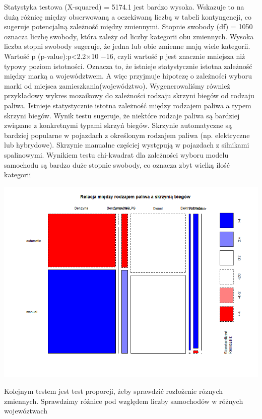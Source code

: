 \documentclass[
]{article}
\begin{document}
Statystyka testowa (X-squared) = 5174.1 jest bardzo wysoka. Wskazuje to
na dużą różnicę między obserwowaną a oczekiwaną liczbą w tabeli
kontyngencji, co sugeruje potencjalną zależność między zmiennymi.
Stopnie swobody (df) = 1050 oznacza liczbę swobody, która zależy od
liczby kategorii obu zmiennych. Wysoka liczba stopni swobody sugeruje,
że jedna lub obie zmienne mają wiele kategorii. Wartość p
(p-value):p\textless2.2×10 −16, czyli wartość p jest znacznie mniejsza
niż typowy poziom istotności. Oznacza to, że istnieje statystycznie
istotna zależność między marką a województwem. A więc przyjmuje hipotezę
o zależności wyboru marki od miejsca zamieszkania(województwo).
Wygenerowaliśmy również przykładowy wykres mozaikowy do zależności
rodzaju skrzyni biegów od rodzaju paliwa. Istnieje statystycznie istotna
zależność między rodzajem paliwa a typem skrzyni biegów. Wynik testu
sugeruje, że niektóre rodzaje paliwa są bardziej związane z konkretnymi
typami skrzyń biegów. Skrzynie automatyczne są bardziej popularne w
pojazdach z określonym rodzajem paliwa (np. elektryczne lub hybrydowe).
Skrzynie manualne częściej występują w pojazdach z silnikami
spalinowymi. Wynikiem testu chi-kwadrat dla zależności wyboru modelu
samochodu są bardzo duże stopnie swobody, co oznacza zbyt wielką ilość
kategorii

\includegraphics[width=1\linewidth]{analiza/mozaikowy_paliwo_skrzynia}

Kolejnym testem jest test proporcji, żeby sprawdzić rozłożenie róznych
zmiennych. Sprawdzimy różnice pod względem liczby samochodów w różnych
wojewóztwach
\end{document}

